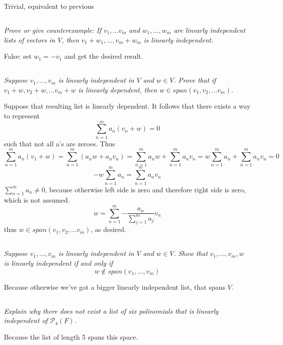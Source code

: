 \documentclass[11pt,oneside,titlepage]{book}
\begin{document}
Trivial, equivalent to previous

\subsection{}
\textit{Prove or give counterexample: If $v_1, ... v_m$ and $w_1, ..., w_m$ are
  linearly independent lists of vectors in $V$, then
  $v_1 + w_1, ..., v_m + w_m$ is linearly independent.}

False: set $w_1 = - v_1$ and get the desired result.

\subsection{}
\textit{Suppose $v_1, ..., v_m$ is linearly independent in $V$ and $w \in V$.
  Prove that if $v_1 + w, v_2 + w, ... v_m + w$ is linearly dependent,
  then $w \in span(v_1, v_2, ... v_m)$.}

Suppose that resulting list is linearly dependent. It follows that there
exists a way to represent 
$$\sum_{n = 1}^m{a_n (v_n + w)} = 0$$
such that not all a's are zeroes. Thus
$$\sum_{n = 1}^m{a_n (v_1 + w)} = \sum_{n = 1}^m{(a_n w + a_n v_n)} =
\sum_{n = 1}^m{a_n w} + \sum_{n = 1}^m{a_n v_n} =
w \sum_{n = 1}^m{a_n} + \sum_{n = 1}^m{a_n v_n} = 0
$$
$$- w \sum_{n = 1}^m{a_n} =  \sum_{n = 1}^m{a_n v_n}$$
$\sum_{n = 1}^m{a_n} \neq 0$, because otherwise left side is zero and
therefore right side is zero, which is not assumed.
$$w  =  \sum_{n = 1}^m{ - \frac{a_n}{\sum_{j = 1}^m{a_j}} v_n}$$
thus $w \in span(v_1, v_2, ... v_m)$, as desired.


\subsection{}
\textit{Suppose $v_1, ..., v_m$ is linearly independent in $V$ and $w \in V$.
  Show that $v_1, ..., v_m, w$ is linearly independent if and only if }
$$w \notin span(v_1, ..., v_m)$$

Because otherwise we've got a bigger linearly independent list, that spans
$V$.

\subsection{}
\textit{Explain why there does not exist a list of six polinomials that is
  linearly independent of $\mathcal{P_4}(F)$.}

Because the list of length 5 spans this space.
\end{document}
